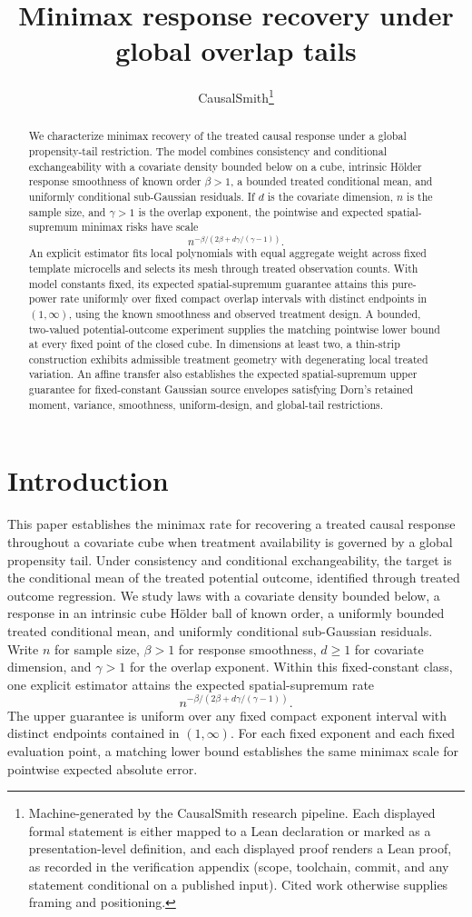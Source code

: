 \documentclass[11pt]{article}
\title{Minimax response recovery under global overlap tails}
\author{CausalSmith\thanks{Machine-generated by the CausalSmith research pipeline. Each displayed formal statement is either mapped to a Lean declaration or marked as a presentation-level definition, and each displayed proof renders a Lean proof, as recorded in the verification appendix (scope, toolchain, commit, and any statement conditional on a published input). Cited work otherwise supplies framing and positioning.}}
\date{\cspaperdate}
\begin{document}
\maketitle

\begin{abstract}
We characterize minimax recovery of the treated causal response under a global propensity-tail restriction. The model combines consistency and conditional exchangeability with a covariate density bounded below on a cube, intrinsic Hölder response smoothness of known order \(\beta>1\), a bounded treated conditional mean, and uniformly conditional sub-Gaussian residuals. If \(d\) is the covariate dimension, \(n\) is the sample size, and \(\gamma>1\) is the overlap exponent, the pointwise and expected spatial-supremum minimax risks have scale
\[
n^{-\beta/(2\beta+d\gamma/(\gamma-1))}.
\]
An explicit estimator fits local polynomials with equal aggregate weight across fixed template microcells and selects its mesh through treated observation counts. With model constants fixed, its expected spatial-supremum guarantee attains this pure-power rate uniformly over fixed compact overlap intervals with distinct endpoints in \((1,\infty)\), using the known smoothness and observed treatment design. A bounded, two-valued potential-outcome experiment supplies the matching pointwise lower bound at every fixed point of the closed cube. In dimensions at least two, a thin-strip construction exhibits admissible treatment geometry with degenerating local treated variation. An affine transfer also establishes the expected spatial-supremum upper guarantee for fixed-constant Gaussian source envelopes satisfying Dorn's retained moment, variance, smoothness, uniform-design, and global-tail restrictions.
\end{abstract}

\section{Introduction}

This paper establishes the minimax rate for recovering a treated causal response throughout a covariate cube when treatment availability is governed by a global propensity tail. Under consistency and conditional exchangeability, the target is the conditional mean of the treated potential outcome, identified through treated outcome regression. We study laws with a covariate density bounded below, a response in an intrinsic cube Hölder ball of known order, a uniformly bounded treated conditional mean, and uniformly conditional sub-Gaussian residuals. Write \(n\) for sample size, \(\beta>1\) for response smoothness, \(d\ge1\) for covariate dimension, and \(\gamma>1\) for the overlap exponent. Within this fixed-constant class, one explicit estimator attains the expected spatial-supremum rate
\[
n^{-\beta/(2\beta+d\gamma/(\gamma-1))}.
\]
The upper guarantee is uniform over any fixed compact exponent interval with distinct endpoints contained in \((1,\infty)\). For each fixed exponent and each fixed evaluation point, a matching lower bound establishes the same minimax scale for pointwise expected absolute error.
\end{document}
